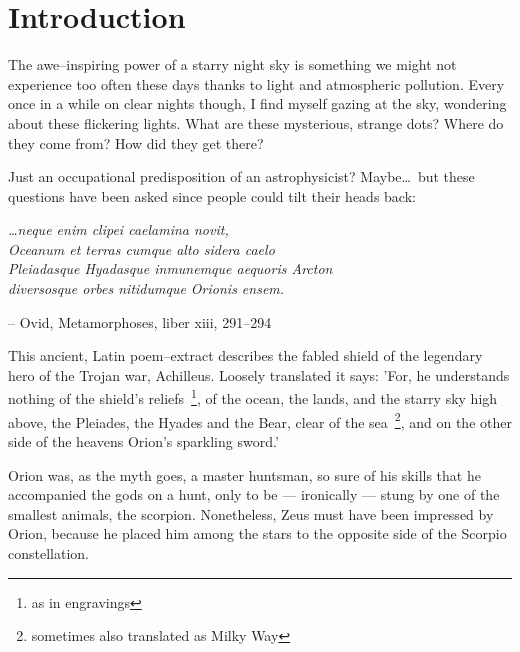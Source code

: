 \chapter{Introduction} %
\label{Chapter1} %

The awe--inspiring power of a starry night sky is something we might not experience too often these days thanks to light and atmospheric pollution.
Every once in a while on clear nights though, I find myself gazing at the sky, wondering about these flickering lights.
What are these mysterious, strange dots? Where do they come from? How did they get there?

Just an occupational predisposition of an astrophysicist? Maybe\dots~but these questions have been asked since people could tilt their heads back:
\vspace{3pt}
\begin{displayquote}
 \textit{\dots neque enim clipei caelamina novit,\\
 Oceanum et terras cumque alto sidera caelo\\
 Pleiadasque Hyadasque inmunemque aequoris Arcton\\
 diversosque orbes nitidumque Orionis ensem.}
\end{displayquote}
\begin{flushright} -- Ovid, Metamorphoses, liber xiii, 291--294 \end{flushright} \vspace{6pt}

This ancient, Latin poem--extract describes the fabled shield of the legendary hero of the Trojan war, Achilleus.
Loosely translated it says: 'For, he understands nothing of the shield's reliefs~\footnote{as in engravings}, of the ocean, the lands, and the starry sky high above, the Pleiades, the Hyades and the Bear, clear of the sea~\footnote{sometimes also translated as Milky Way}, and on the other side of the heavens Orion's sparkling sword.'

Orion was, as the myth goes, a master huntsman, so sure of his skills that he accompanied the gods on a hunt, only to be --- ironically --- stung by one of the smallest animals, the scorpion.
Nonetheless, Zeus must have been impressed by Orion, because he placed him among the stars to the opposite side of the Scorpio constellation.

